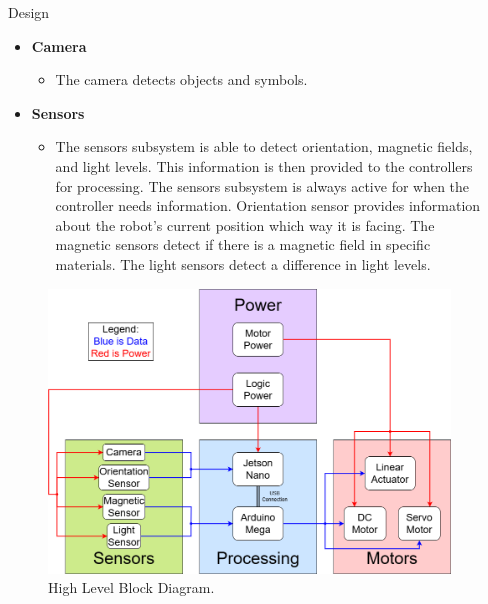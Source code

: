 \documentclass[final]{beamer}
\newlength{\sepwidth}
\newlength{\colwidth}
\newcommand{\separatorcolumn}{\begin{column}{\sepwidth}\end{column}}
\begin{document}
\begin{frame}[t]
\begin{columns}[t]
\begin{column}{\colwidth}
\begin{block}{Design}
\begin{itemize}
      \item \textbf{Camera}
        \begin{itemize}
          \item The camera detects objects and symbols.
        \end{itemize}
      
      \item \textbf{Sensors}
        \begin{itemize}
          \item The sensors subsystem is able to detect orientation, magnetic fields, and light levels. This information is then provided to the controllers for processing. The sensors subsystem is always active for when the controller needs information. Orientation sensor provides information about the robot's current position which way it is facing. The magnetic sensors detect if there is a magnetic field in specific materials. The light sensors detect a difference in light levels.
        \end{itemize}
    
    \end{itemize}

    \begin{figure}
      \centering
      \includegraphics[width=20.0cm]{High_Block_Diagram.png}
      \caption{High Level Block Diagram.}
    \end{figure}
  
  \end{block}

\end{column}

\separatorcolumn


\end{columns}
\end{frame}
\end{document}
